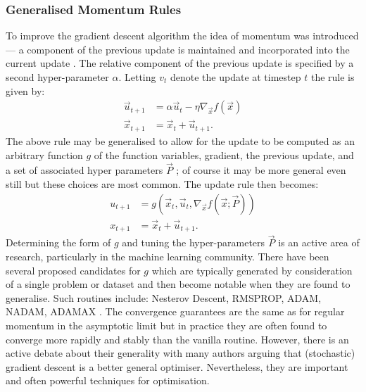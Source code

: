 \subsubsection{Generalised Momentum Rules}
To improve the gradient descent algorithm the idea of momentum was introduced --- a component of the previous update is maintained and incorporated into the current update \cite{Polyak1964-bt}. The relative component of the previous update is specified by a second hyper-parameter $\alpha$. Letting $v_t$ denote the update at timestep $t$ the rule is given by:
\begin{align}
\vec{u}_{t+1} &= \alpha \vec{u}_t - \eta \nabla_{\vec{x}} f(\vec{x}) \\
\vec{x}_{t+1} &= \vec{x}_t + \vec{u}_{t+1}.
\end{align}
The above rule may be generalised to allow for the update to be computed as an arbitrary function $g$ of the function variables, gradient, the previous update, and a set of associated hyper parameters $\vec{P}$ ; of course it may be more general even still but these choices are most common. The update rule then becomes:
\begin{align}
u_{t+1} &= g(\vec{x}_t, \vec{u}_t, \nabla_{\vec{x}} f(\vec{x}; \vec{P})) \\
x_{t+1} &= \vec{x}_t + \vec{u}_{t+1}.
\end{align}
Determining the form of $g$ and tuning the hyper-parameters $\vec{P}$ is an active area of research, particularly in the machine learning community. There have been several proposed candidates for $g$ which are typically generated by consideration of a single problem or dataset and then become notable when they are found to generalise. Such routines include: Nesterov Descent, RMSPROP, ADAM, NADAM, ADAMAX \cite{Sutskever2013-ng, Dozat2016-dj, kingma2017adam}. The convergence guarantees are the same as for regular momentum in the asymptotic limit but in practice they are often found to converge more rapidly and stably than the vanilla routine. However, there is an active debate about their generality with many authors arguing that (stochastic) gradient descent is a better general optimiser. Nevertheless, they are important and often powerful techniques for optimisation.
